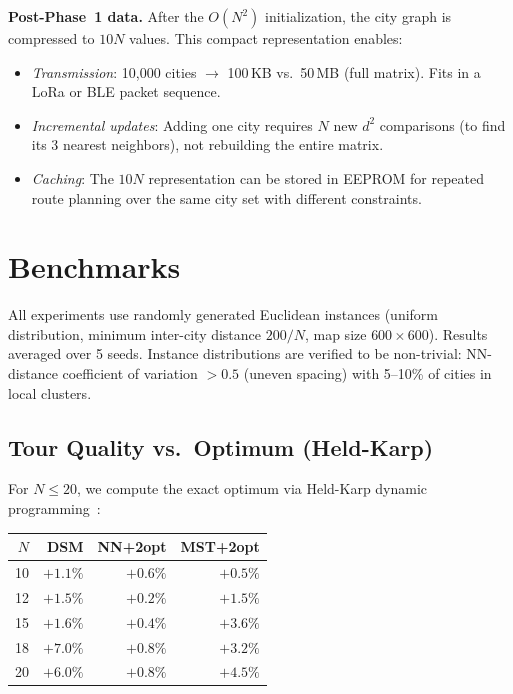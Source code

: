 \documentclass[11pt,a4paper,twocolumn]{article}
\begin{document}
\textbf{Post-Phase~1 data.} After the $O(N^2)$ initialization, the city graph is compressed to $10N$ values. This compact representation enables:
\begin{itemize}[leftmargin=*,itemsep=1pt]
\item \textit{Transmission}: 10,000 cities $\to$ 100\,KB vs.\ 50\,MB (full matrix). Fits in a LoRa or BLE packet sequence.
\item \textit{Incremental updates}: Adding one city requires $N$ new $d^2$ comparisons (to find its 3 nearest neighbors), not rebuilding the entire matrix.
\item \textit{Caching}: The $10N$ representation can be stored in EEPROM for repeated route planning over the same city set with different constraints.
\end{itemize}

\FloatBarrier
\section{Benchmarks}\label{sec:bench}

All experiments use randomly generated Euclidean instances (uniform distribution, minimum inter-city distance $200/N$, map size $600{\times}600$). Results averaged over 5 seeds. Instance distributions are verified to be non-trivial: NN-distance coefficient of variation $> 0.5$ (uneven spacing) with 5--10\% of cities in local clusters.

\subsection{Tour Quality vs.\ Optimum (Held-Karp)}

For $N{\leq}20$, we compute the exact optimum via Held-Karp dynamic programming~\cite{held1962}:

\smallskip
\noindent\begin{minipage}{\columnwidth}
\centering\small
{}\label{tab:opt}
\smallskip
\begin{tabular}{@{}rrrr@{}}
\toprule
$N$ & DSM & NN+2opt & MST+2opt \\
\midrule
10 & $+1.1\%$ & $+0.6\%$ & $+0.5\%$ \\
12 & $+1.5\%$ & $+0.2\%$ & $+1.5\%$ \\
15 & $+1.6\%$ & $+0.4\%$ & $+3.6\%$ \\
18 & $+7.0\%$ & $+0.8\%$ & $+3.2\%$ \\
20 & $+6.0\%$ & $+0.8\%$ & $+4.5\%$ \\
\bottomrule
\end{tabular}
\end{minipage}
\medskip
\end{document}
